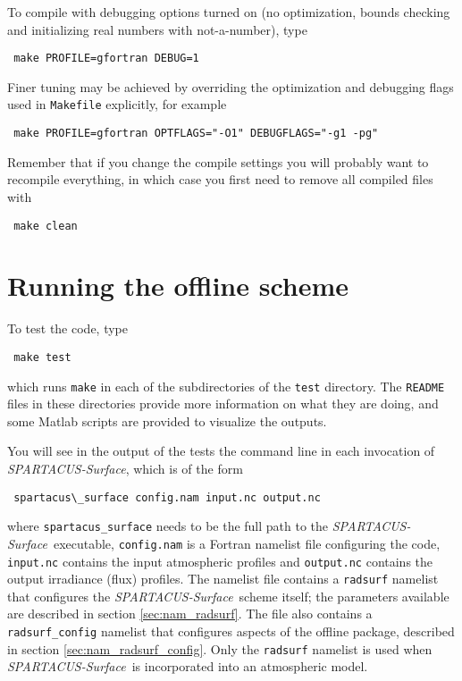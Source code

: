 \documentclass[a4,oneside]{article}
\def\codesize{\small}
\def\spsurf{\emph{SPARTACUS-Surface}}
\def\code#1{{\codesize\texttt{#1}}}
\begin{document}
To compile with debugging options turned on (no optimization, bounds
checking and initializing real numbers with not-a-number), type
\begin{lstlisting}
 make PROFILE=gfortran DEBUG=1
\end{lstlisting}
Finer tuning may be achieved by overriding the optimization and
debugging flags used in \code{Makefile} explicitly, for example
\begin{lstlisting}
 make PROFILE=gfortran OPTFLAGS="-O1" DEBUGFLAGS="-g1 -pg"
\end{lstlisting}
Remember that if you change the compile settings you will probably
want to recompile everything, in which case you first need to remove
all compiled files with
\begin{lstlisting}
 make clean
\end{lstlisting}

\section{Running the offline scheme}
 To test the code, type
\begin{lstlisting}
 make test
\end{lstlisting}
which runs \code{make} in each of the subdirectories of the
\code{test} directory. The \code{README} files in these directories
provide more information on what they are doing, and some Matlab
scripts are provided to visualize the outputs.

You will see in the output of the tests the command line in each
invocation of \spsurf, which is of the form
%
\begin{lstlisting}
 spartacus\_surface config.nam input.nc output.nc
\end{lstlisting}
where \code{spartacus\_surface} needs to be the full path to the
\spsurf\ executable, \code{config.nam} is a Fortran namelist file
configuring the code, \code{input.nc} contains the input atmospheric
profiles and \code{output.nc} contains the output irradiance (flux)
profiles.  The namelist file contains a \code{radsurf} namelist that
configures the \spsurf\ scheme itself; the parameters available are
described in section \ref{sec:nam_radsurf}. The file also contains a
\code{radsurf\_config} namelist that configures aspects of the offline
package, described in section \ref{sec:nam_radsurf_config}.  Only the
\code{radsurf} namelist is used when \spsurf\ is incorporated into an
atmospheric model.
\end{document}
